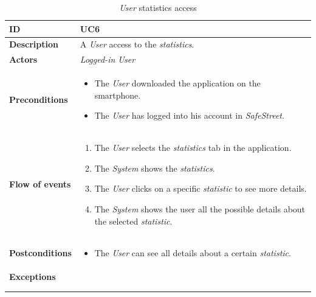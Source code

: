 \documentclass {article}
\begin{document}
	\begin{longtable}{| p{3 cm} | p{10.5 cm} |} 
			\hline
			{\bf ID} & UC6 \\
			\hline
			{\bf Description} & A {\it User} access to the {\it statistics}.\\
			\hline
			{\bf Actors} & {\it Logged-in User}\\
			\hline
			{\bf Preconditions} & 	
			\begin{itemize}
				\item The {\it User} downloaded the application on the smartphone.
				\item The {\it User} has logged into his account in {\it SafeStreet}.
			\end{itemize}
			\\
			\hline
			{\bf Flow of events} &	
			\begin{enumerate}
				\item The {\it User} selects the {\it statistics} tab in the application.
				\item The {\it System} shows the {\it statistics}.
				\item The {\it User} clicks on a specific {\it statistic} to see more details. 
				\item The {\it System} shows the user all the possible details about the selected {\it statistic}. 
			\end{enumerate}
			\\
			\hline
			{\bf Postconditions} & 
			\begin{itemize}
				\item The {\it User} can see all details about a certain {\it statistic}.
			\end{itemize}
			\\
			\hline
			{\bf Exceptions} & 	
			\\ \\
			\hline
			\caption{{\it User} statistics access}
			\end{longtable}
			
\end{document}
